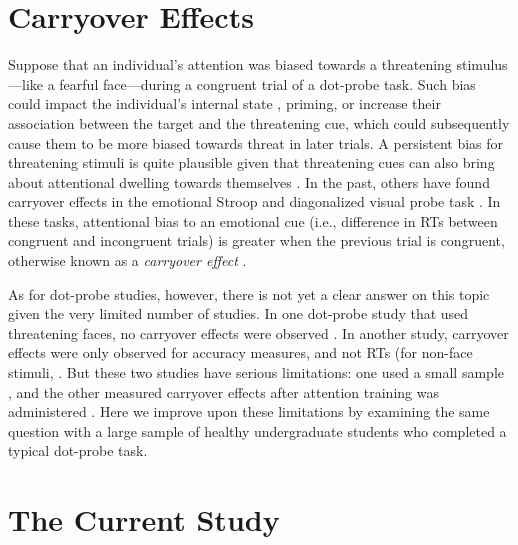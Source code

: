 \documentclass{article}
\begin{document}
	\section{Carryover Effects}



	Suppose that an individual’s attention was biased towards a threatening stimulus—like a fearful face—during a congruent trial of a dot-probe task. Such bias could impact the individual’s internal state \parencite{Panksepp2011}, priming, or increase their association between the target and the threatening cue, which could subsequently cause them to be more biased towards threat in later trials. A persistent bias for threatening stimuli is quite plausible given that threatening cues can also bring about attentional dwelling towards themselves \parencite{Carlson2014, Fox2001}. In the past, others have found carryover effects in the emotional Stroop \parencite{Cane2009, Clarke2015, Waters2005, Wilson2007} and diagonalized visual probe task \parencite{Gladwin2019, Gladwin2020, Gladwin2019a}. In these tasks, attentional bias to an emotional cue (i.e., difference in RTs between congruent and incongruent trials) is greater when the previous trial is congruent, otherwise known as a \emph{carryover effect }\parencite{Gladwin2019}.



	As for dot-probe studies, however, there is not yet a clear answer on this topic given the very limited number of studies. In one dot-probe study that used threatening faces, no carryover effects were observed \parencite{Hill2016}. In another study, carryover effects were only observed for accuracy measures, and not RTs (for non-face stimuli, \parencite{Gladwin2017}. But these two studies have serious limitations: one used a small sample \parencite{Gladwin2017}, and the other measured carryover effects after attention training was administered \parencite{Hill2016}. Here we improve upon these limitations by examining the same question with a large sample of healthy undergraduate students who completed a typical dot-probe task.



	\section{The Current Study}
\end{document}
